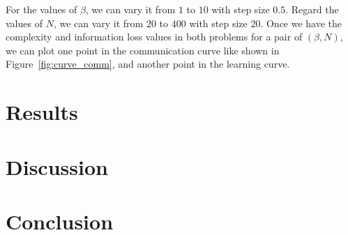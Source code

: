 \documentclass[11pt]{article}
\begin{document}
For the values of $\beta$, we can vary it from $1$ to $10$ with step size $0.5$. 
Regard the values of $N$, we can vary it from $20$ to $400$ with step size $20$.
Once we have the complexity and information loss values in both problems for a pair of $(\beta, N)$, we can plot one point in the communication curve like shown in Figure~\ref{fig:curve_comm}, and another point in the learning curve.

\section{Results}
\section{Discussion}
\section{Conclusion}



\end{document}
